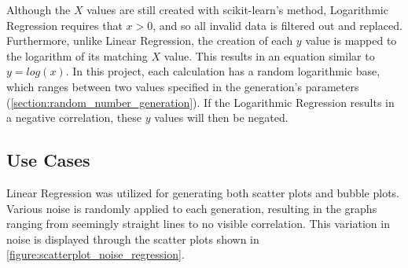 \hfill

Although the \(X\) values are still created with scikit-learn's  method, Logarithmic Regression requires that \(x>0\), and so all invalid data is filtered out and replaced. Furthermore, unlike Linear Regression, the creation of each \(y\) value is mapped to the logarithm of its matching \(X\) value. This results in an equation similar to \(y = log(x)\). In this project, each calculation has a random logarithmic base, which ranges between two values specified in the generation's parameters (\autoref{section:random_number_generation}). If the Logarithmic Regression results in a negative correlation, these \(y\) values will then be negated.

\subsection{Use Cases}

Linear Regression was utilized for generating both scatter plots and bubble plots. Various noise is randomly applied to each generation, resulting in the graphs ranging from seemingly straight lines to no visible correlation. This variation in noise is displayed through the scatter plots shown in \autoref{figure:scatterplot_noise_regression}.

\hfill


